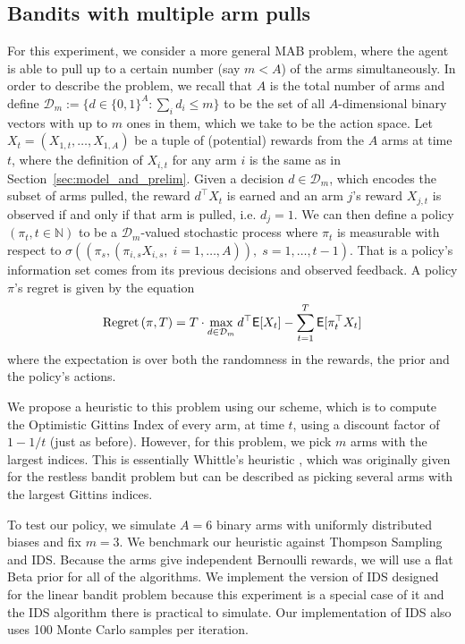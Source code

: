 \subsection{Bandits with multiple arm pulls}
For this experiment, we consider a more general MAB problem, where the agent is able to pull up to a certain number (say $m < A$) of the arms simultaneously. In order to describe the problem, we recall that $A$ is the total number of arms and define  $\mathcal{D}_m := \{d \in \{0,1\}^A : \sum_i d_i \le m\}$ to be the set of all $A$-dimensional binary vectors with up to $m$ ones in them, which we take to be the action space. Let $X_t = (X_{1,t}, \ldots, X_{1,A})$ be a tuple of (potential) rewards from the $A$ arms at time $t$, where the definition of $X_{i,t}$ for any arm $i$ is the same as in Section~\ref{sec:model_and_prelim}. Given a decision $d \in \mathcal D_m$, which encodes the subset of arms pulled, the reward $d^\top X_t$ is earned and an arm $j$'s reward $X_{j,t}$ is observed if and only if that arm is pulled, i.e. $d_{j} = 1$. We can then define a policy $(\pi_t, t \in \mathbb{N})$ to be a $\mathcal{D}_m$-valued stochastic process where $\pi_t$ is measurable with respect to $\sigma\left( (\pi_s, (\pi_{i,s} X_{i,s}, \;i =1,\ldots,A)), \; s=1,\ldots,t-1\right)$. That is a policy's information set comes from its previous decisions and observed feedback. A policy $\pi$'s regret is given by the equation 
\[
\textnormal{Regret} \left( \pi, T \right) = T \cdot \max_{d \in \mathcal D_m} d^\top \mathsf{E}[ X_t] - \sum_{t=1}^T \mathsf{E}[\pi_t^\top X_t ]
\]
where the expectation is over both the randomness in the rewards, the prior and the policy's actions.

We propose a heuristic to this problem using our scheme, which is to compute the Optimistic Gittins Index of every arm, at time $t$, using a discount factor of $1-1/t$ (just as before). However, for this problem, we pick $m$ arms with the largest indices. This is essentially Whittle's heuristic \citep{whittle1988restless}, which was originally given for the restless bandit problem but can be described as picking several arms with the largest Gittins indices.

To test our policy, we simulate $A = 6$ binary arms with uniformly distributed biases and fix $m=3$. 
We benchmark our heuristic against Thompson Sampling and IDS. Because the arms give independent Bernoulli rewards, we will use a flat Beta prior for all of the algorithms. We implement the version of IDS designed for the linear bandit problem because this experiment is a special case of it and the IDS algorithm there is practical to simulate. Our implementation of IDS also uses 100 Monte Carlo samples per iteration.


